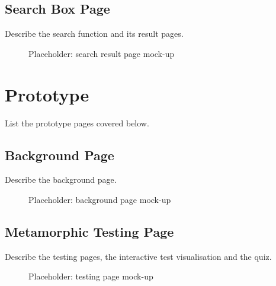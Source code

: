 \documentclass[
  12pt,
  a4paper,
]{report}
\begin{document}
\subsection{Search Box Page}\label{search-box-page}

Describe the search function and its result pages.

\begin{figure}
\centering
{}
\caption{Placeholder: search result page mock-up}
\end{figure}

\section{Prototype}\label{prototype}

List the prototype pages covered below.

\subsection{Background Page}\label{background-page}

Describe the background page.

\begin{figure}
\centering
{}
\caption{Placeholder: background page mock-up}
\end{figure}

\subsection{Metamorphic Testing Page}\label{metamorphic-testing-page}

Describe the testing pages, the interactive test visualisation and the
quiz.

\begin{figure}
\centering
{}
\caption{Placeholder: testing page mock-up}
\end{figure}
\end{document}
